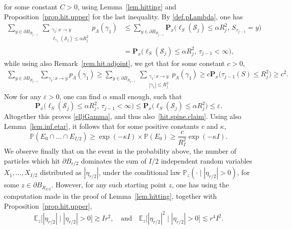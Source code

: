\documentclass[JEP,XML,SOM,Unicode,NoFloatCountersInSection,published]{cedram}
\theoremstyle{plain}
\theoremstyle{definition}
\newcommand\cS{\mathcal{S}}
\newcommand{\1}{{\text{\Large $\mathfrak 1$}}}
\begin{document}
for some constant $C>0$, using Lemma~\ref{lem.hitting} and Proposition~\ref{prop.hit.upper} for the last inequality. By \eqref{def.pLambda},
one has
\begin{align*}
\sum_{y\in \partial B_{R_{j-1}}}\ \sum_{\substack{\gamma_1:x \to y \\
\ell_{\gamma_1}(\cS_j)\le \alpha R_j^2}} p_\Lambda(\gamma_1)
& \le \sum_{y\in \partial B_{R_{j-1}}}
\mathbf P_x\big(\ell_S(\cS_j) \le \alpha R_j^2,\, S_{\tau_{j-1}}=y\big)\\
& = \mathbf P_x\big(\ell_S(\cS_j) \le \alpha R_j^2,\, \tau_{j-1}<\infty \big),
\end{align*}
while using also Remark~\ref{rem.hit.adjoint}, we get that for some constant $c>0$,
\begin{align*}
\sum_{y\in \partial B_{R_{j-1}}} \sum_{\gamma_1:x \to y} p_\Lambda(\gamma_1)
\ge \sum_{y\in \partial B_{R_{j-1}}} \ \sum_{\substack{\gamma_1:x \to y \\ |\gamma_1|\le R_j^2}} p_\Lambda(\gamma_1) \ge c \mathbf P_x\big(\tau_{j-1}(S)\le R_j^2) \ge c^2.
\end{align*}
Now for any $\varepsilon>0$, one can find $\alpha$ small enough, such that
\[
\mathbf P_x\big(\ell_S(\cS_j) \le \alpha R_j^2,\, \tau_{j-1}<\infty \big)\le \mathbf P_x\big(\ell_S(\cS_j) \le \alpha R_j^2\big)\le \varepsilon.
\]
Altogether this proves \eqref{elljGamma}, and thus also~\eqref{hit.spine.claim}. Using also Lemma~\ref{lem.inf.etar}, it follows that for some positive constants $c$ and $\kappa$,
\begin{equation*}%
\mathbb P(E_0\cap \dots \cap E_{I/2}) \ge \exp(-\kappa I)\times\mathbb P(E_0) \ge \frac{c}{R_I^2} \exp(-\kappa I).
\end{equation*}
We observe finally that on the event in the probability above,
the number of particles which hit $\partial B_{r/2}$ dominates the sum of $I/2$ independent random variables $X_1,\dots,X_{I/2}$ distributed as $|\eta_{r/2}|$,
under the conditional law $\mathbb P_z(\cdot \mid |\eta_{r/2}|>0)$,
for some $z\in \partial B_{R_{I/2}}$.
However, for any such starting point $z$, one has using the computation made in the proof of Lemma~\ref{lem.hitting}, together
with Proposition~\ref{prop.hit.upper},
\[
\mathbb E_z\big[|\eta_{r/2}|\mid |\eta_{r/2}|> 0\big] \gtrsim I r^2, \quad\text{and}\quad
\mathbb E_z\big[|\eta_{r/2}|^2\mid |\eta_{r/2}|>0\big] \lesssim r^4I^2.
\]
\end{document}
